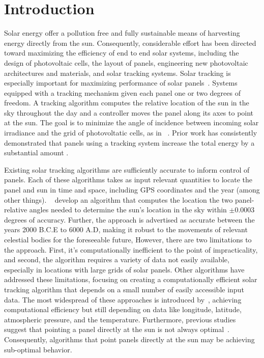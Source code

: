 \documentclass[11pt]{article}
\begin{document}
\section{Introduction}
Solar energy offer a pollution free and fully sustainable means of harvesting energy directly from the sun. Consequently, considerable effort has been directed toward maximizing the efficiency of end to end solar systems, including the design of photovoltaic cells, the layout of panels, engineering new photovoltaic architectures and materials, and solar tracking systems. Solar tracking is especially important for maximizing performance of solar panels~\cite{Eke2012,Rizk2008,King2001}. Systems equipped with a tracking mechanism given each panel one or two degrees of freedom. A tracking algorithm computes the relative location of the sun in the sky throughout the day and a controller moves the panel along its axes to point at the sun. The goal is to minimize the angle of incidence between incoming solar irradiance and the grid of photovoltatic cells, as in ~\citet{Eke2012,Benghanem2011,King2001}. Prior work has consistently demonstrated that panels using a tracking system increase the total energy by a substantial amount .

Existing solar tracking algorithms are sufficiently accurate to inform control of panels. Each of these algorithms takes as input relevant quantities to locate the panel and sun in time and space, including GPS coordinates and the year (among other things). ~\citet{reda2004solar} develop an algorithm that computes the location the two panel-relative angles needed to determine the sun's location in the sky within $\pm 0.0003$ degrees of accuracy. Further, the approach is advertised as accurate between the years 2000 B.C.E to 6000 A.D, making it robust to the movements of relevant celestial bodies for the foreseeable future, However, there are two limitations to the approach. First, it's computationally inefficient to the point of impracticality, and second, the algorithm requires a variety of data not easily available, especially in locations with large grids of solar panels. Other algorithms have addressed these limitations, focusing on creating a computationally efficient solar tracking algorithm that depends on a small number of easily accessible input data. The most widespread of these approaches is introduced by~\citet{Grena2008}, achieving computational efficiency but still depending on data like longitude, latitude, atmospheric pressure, and the temperature. Furthermore, previous studies suggest that pointing a panel directly at the sun is not always optimal~\citet{Kelly2009,Hussein1995,King2001}. Consequently, algorithms that point panels directly at the sun may be achieving sub-optimal behavior.\\
\end{document}
